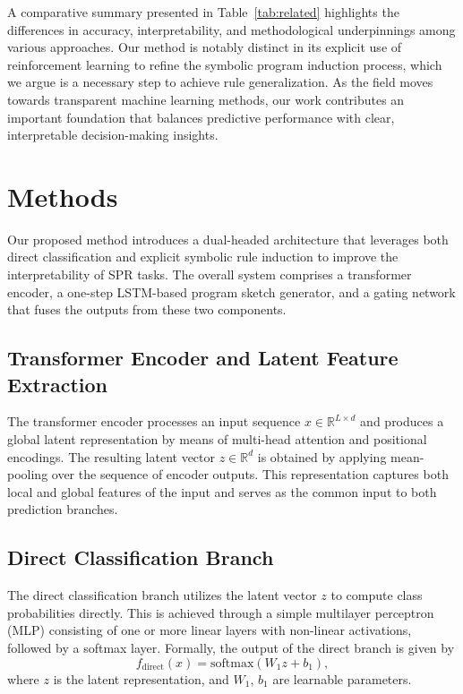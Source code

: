 \documentclass{article}
\begin{document}
A comparative summary presented in Table~\ref{tab:related} highlights the differences in accuracy, interpretability, and methodological underpinnings among various approaches. Our method is notably distinct in its explicit use of reinforcement learning to refine the symbolic program induction process, which we argue is a necessary step to achieve rule generalization. As the field moves towards transparent machine learning methods, our work contributes an important foundation that balances predictive performance with clear, interpretable decision-making insights.

\section{Methods}
Our proposed method introduces a dual-headed architecture that leverages both direct classification and explicit symbolic rule induction to improve the interpretability of SPR tasks. The overall system comprises a transformer encoder, a one-step LSTM-based program sketch generator, and a gating network that fuses the outputs from these two components.

\subsection{Transformer Encoder and Latent Feature Extraction}
The transformer encoder processes an input sequence \( x \in \mathbb{R}^{L \times d} \) and produces a global latent representation by means of multi-head attention and positional encodings. The resulting latent vector \( z \in \mathbb{R}^{d} \) is obtained by applying mean-pooling over the sequence of encoder outputs. This representation captures both local and global features of the input and serves as the common input to both prediction branches.

\subsection{Direct Classification Branch}
The direct classification branch utilizes the latent vector \( z \) to compute class probabilities directly. This is achieved through a simple multilayer perceptron (MLP) consisting of one or more linear layers with non-linear activations, followed by a softmax layer. Formally, the output of the direct branch is given by
\[
f_{\mathrm{direct}}(x) = \mathrm{softmax}(W_1 z + b_1),
\]
where \( z \) is the latent representation, and \( W_1 \), \( b_1 \) are learnable parameters.
\end{document}
